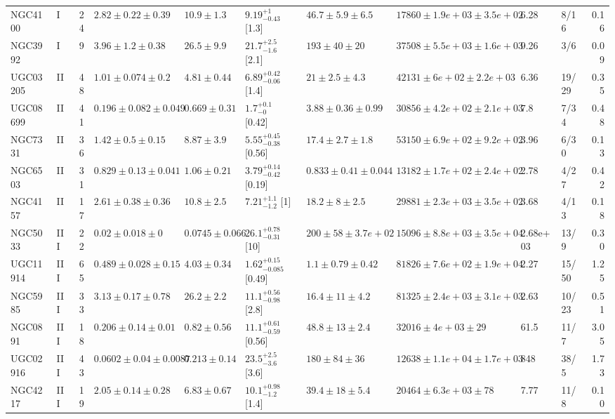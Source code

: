 \documentclass[10pt]{article}
\begin{document}
\begin{landscape}
{\begin{longtable}{llrlllllllr}
NGC4100 & I & 24 & $2.82\pm0.22\pm0.39$ & $10.9\pm1.3$ & $9.19^{+1}_{-0.43}$ [1.3] & $46.7\pm5.9\pm6.5$ & $17860\pm1.9e+03\pm3.5e+02$ & 6.28 & 8/16 & 0.16\\
NGC3992 & I & 9 & $3.96\pm1.2\pm0.38$ & $26.5\pm9.9$ & $21.7^{+2.5}_{-1.6}$ [2.1] & $193\pm40\pm20$ & $37508\pm5.5e+03\pm1.6e+03$ & 9.26 & 3/6 & 0.09\\
UGC03205 & II & 48 & $1.01\pm0.074\pm0.2$ & $4.81\pm0.44$ & $6.89^{+0.42}_{-0.06}$ [1.4] & $21\pm2.5\pm4.3$ & $42131\pm6e+02\pm2.2e+03$ & 6.36 & 19/29 & 0.35\\
UGC08699 & II & 41 & $0.196\pm0.082\pm0.049$ & $0.669\pm0.31$ & $1.7^{+0.1}_{-0}$ [0.42] & $3.88\pm0.36\pm0.99$ & $30856\pm4.2e+02\pm2.1e+03$ & 7.8 & 7/34 & 0.48\\
NGC7331 & II & 36 & $1.42\pm0.5\pm0.15$ & $8.87\pm3.9$ & $5.55^{+0.45}_{-0.38}$ [0.56] & $17.4\pm2.7\pm1.8$ & $53150\pm6.9e+02\pm9.2e+02$ & 3.96 & 6/30 & 0.13\\
NGC6503 & II & 31 & $0.829\pm0.13\pm0.041$ & $1.06\pm0.21$ & $3.79^{+0.14}_{-0.42}$ [0.19] & $0.833\pm0.41\pm0.044$ & $13182\pm1.7e+02\pm2.4e+02$ & 2.78 & 4/27 & 0.42\\
NGC4157 & II & 17 & $2.61\pm0.38\pm0.36$ & $10.8\pm2.5$ & $7.21^{+1.1}_{-1.2}$ [1] & $18.2\pm8\pm2.5$ & $29881\pm2.3e+03\pm3.5e+02$ & 3.68 & 4/13 & 0.18\\
NGC5033 & III & 22 & $0.02\pm0.018\pm0$ & $0.0745\pm0.066$ & $26.1^{+0.78}_{-0.31}$ [10] & $200\pm58\pm3.7e+02$ & $15096\pm8.8e+03\pm3.5e+04$ & 2.68e+03 & 13/9 & 0.30\\
UGC11914 & III & 65 & $0.489\pm0.028\pm0.15$ & $4.03\pm0.34$ & $1.62^{+0.15}_{-0.085}$ [0.49] & $1.1\pm0.79\pm0.42$ & $81826\pm7.6e+02\pm1.9e+04$ & 2.27 & 15/50 & 1.25\\
NGC5985 & III & 33 & $3.13\pm0.17\pm0.78$ & $26.2\pm2.2$ & $11.1^{+0.56}_{-0.98}$ [2.8] & $16.4\pm11\pm4.2$ & $81325\pm2.4e+03\pm3.1e+03$ & 2.63 & 10/23 & 0.51\\
NGC0891 & III & 18 & $0.206\pm0.14\pm0.01$ & $0.82\pm0.56$ & $11.1^{+0.61}_{-0.59}$ [0.56] & $48.8\pm13\pm2.4$ & $32016\pm4e+03\pm29$ & 61.5 & 11/7 & 3.05\\
UGC02916 & III & 43 & $0.0602\pm0.04\pm0.0087$ & $0.213\pm0.14$ & $23.5^{+2.5}_{-3.6}$ [3.6] & $180\pm84\pm36$ & $12638\pm1.1e+04\pm1.7e+03$ & 848 & 38/5 & 1.73\\
NGC4217 & III & 19 & $2.05\pm0.14\pm0.28$ & $6.83\pm0.67$ & $10.1^{+0.98}_{-1.2}$ [1.4] & $39.4\pm18\pm5.4$ & $20464\pm6.3e+03\pm78$ & 7.77 & 11/8 & 0.10\\

\end{longtable}}
\end{landscape}
\end{document}
